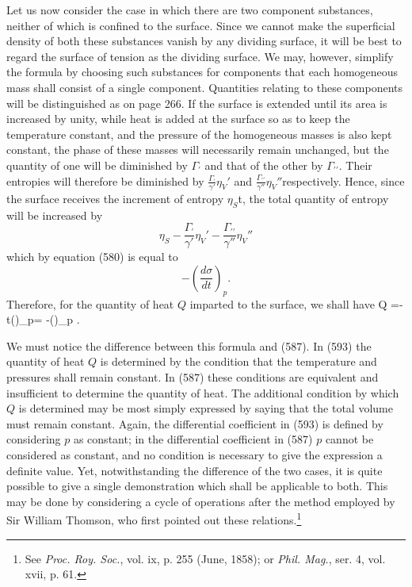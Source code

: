 \documentclass[12pt]{article}
\begin{document}
{Let us now consider the case in which there are two component substances, neither of which is confined to the surface. Since we cannot make the superficial density of both these substances vanish by any dividing surface, it will be best to regard the surface of tension as the dividing surface. We may, however, simplify the formula by choosing such substances for components that each homogeneous mass shall consist of a single component. Quantities relating to these components will be distinguished as on page 266. If the surface is extended until its area is increased by unity, while heat is added at the surface so as to keep the temperature constant, and the pressure of the homogeneous masses is also kept constant, the phase of these masses will necessarily remain unchanged, but the quantity of one will be diminished by $\Gamma_\prime$ and that of the other by $\Gamma_{\prime\prime}$. Their entropies will therefore be diminished by $\frac{\Gamma_\prime}{\gamma'}\eta_V'$  and $\frac{\Gamma_{\prime\prime}}{\gamma''}\eta_V''$respectively. Hence, since the surface receives the increment of entropy $\eta_S$t, the total quantity of entropy will be increased by
$$\eta_S - \frac{\Gamma_\prime}{\gamma'}\eta_V'- \frac{\Gamma_{\prime\prime}}{\gamma''}\eta_V''$$
which by equation (580) is equal to
$$-\left(\frac{d\sigma}{dt}\right)_p.$$
Therefore, for the quantity of heat $Q$ imparted to the surface, we shall have
\eqs Q =-t\left(\right)_p= -\left(\right)_p . \label{593} \eqe

We must notice the difference between this formula and (587). In (593) the quantity of heat $Q$ is determined by the condition that the temperature and pressures shall remain constant. In (587) these conditions are equivalent and insufficient to determine the quantity of heat. The additional condition by which $Q$ is determined may be most simply expressed by saying that the total volume must remain constant. Again, the differential coefficient in (593) is defined by considering $p$ as constant; in the differential coefficient in (587) $p$ cannot be considered as constant, and no condition is necessary to give the expression a definite value. Yet, notwithstanding the difference of the two cases, it is quite possible to give a single demonstration which shall be applicable to both. This may be done by considering a cycle of operations after the method employed by Sir William Thomson, who first pointed out these relations.\footnote{See \textit{Proc. Roy. Soc.}, vol. ix, p. 255 (June, 1858); or \textit{Phil. Mag.}, ser. 4, vol. xvii, p. 61.}

}
\end{document}
